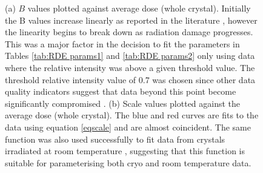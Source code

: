 \begin{figure}
\begin{subfigure}[b]{0.825\textwidth}
                \caption{}
                \label{figscalevalues}
        \end{subfigure}
        \caption{(a) $B$ values plotted against average dose (whole crystal).
		Initially the B values increase linearly as reported in the literature \cite{kmetko2006, warkentin2010, leal2012}, however the linearity begins to break down as radiation damage progresses.
		This was a major factor in the decision to fit the parameters in Tables \ref{tab:RDE params1} and \ref{tab:RDE params2} only using data where the relative intensity was above a given threshold value.
		The threshold relative intensity value of 0.7 was chosen since other data quality indicators suggest that data beyond this point become significantly compromised \cite{owen2006}.
		(b) Scale values plotted against the average dose (whole crystal).
		The blue and red curves are fits to the data using equation \ref{eqscale} and are almost coincident.
		The same function was also used successfully to fit data from crystals irradiated at room temperature \cite{leal2012}, suggesting that this function is suitable for parameterising both cryo and room temperature data.}
        \label{figlealparam}
\end{figure}

